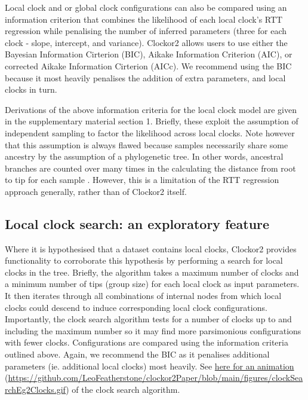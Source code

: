 \documentclass{article}
\begin{document}
Local clock and or global clock configurations can also be compared using an information criterion that combines the likelihood of each local clock's RTT regression while penalising the number of inferred parameters (three for each clock - slope, intercept, and variance). Clockor2 allows users to use either the Bayesian Information Cirterion (BIC), Aikake Information Criterion (AIC), or corrected Aikake Information Cirterion (AICc). We recommend using the BIC because it most heavily penalises the addition of extra parameters, and local clocks in turn.

Derivations of the above information criteria for the local clock model are given in the supplementary material section 1. Briefly, these exploit the assumption of independent sampling to factor the likelihood across local clocks. Note however that this assumption is always flawed because samples necessarily share some ancestry by the assumption of a phylogenetic tree. In other words, ancestral branches are counted over many times in the calculating the distance from root to tip for each sample \citep{duchene_2016_estimating}. However, this is a limitation of the RTT regression approach generally, rather than of Clockor2 itself.

\subsection*{{Local clock search: an exploratory feature}}
Where it is hypothesised that a dataset contains local clocks, Clockor2 provides functionality to corroborate this hypothesis by performing a search for local clocks in the tree. Briefly, the algorithm takes a maximum number of clocks and a minimum number of tips (group size) for each local clock as input parameters. It then iterates through all combinations of internal nodes from which local clocks could descend to induce corresponding local clock configurations. Importantly, the clock search algorithm tests for a number of clocks up to and including the maximum number so it may find more parsimonious configurations with fewer clocks. Configurations are compared using the information criteria outlined above. Again, we recommend the BIC as it penalises additional parameters (ie. additional local clocks) most heavily. See \href{https://github.com/LeoFeatherstone/clockor2Paper/blob/main/figures/clockSearchEg2Clocks.gif}{here for an animation} (\url{https://github.com/LeoFeatherstone/clockor2Paper/blob/main/figures/clockSearchEg2Clocks.gif}) of the clock search algorithm. 
\end{document}
